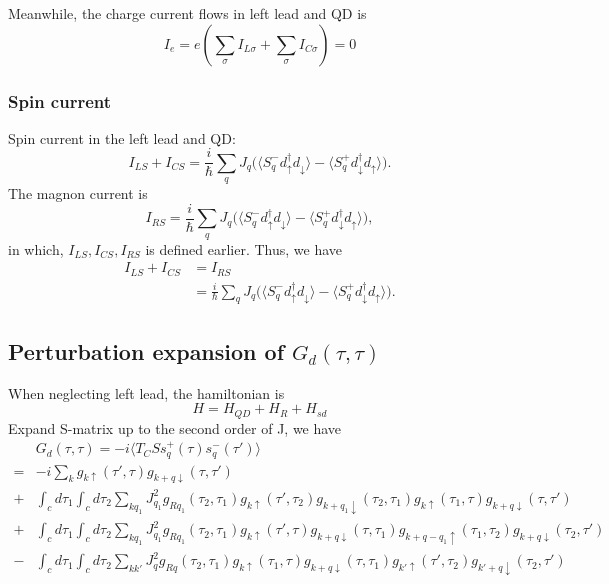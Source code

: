 \documentclass[11pt,a4paper]{book}
\begin{document}
Meanwhile, the charge current flows in left lead and QD is
\begin{equation}
I_{e} = e(\sum_{\sigma}I_{L\sigma} + \sum_{\sigma}I_{C\sigma}) = 0
\end{equation}
\subsubsection{Spin current}
Spin current in the left lead and QD:
\begin{equation}
I_{LS} + I_{CS} = \frac{i}{\hbar} \sum_{q} J_{q} \big( \big\langle S_{q}^{-}d_{\uparrow}^{\dag}d_{\downarrow}\big\rangle - \big\langle S_{q}^{+}d_{\downarrow}^{\dag}d_{\uparrow} \big\rangle \big) .
\end{equation}
The magnon current is
\begin{equation}
I_{RS} = \frac{i}{\hbar} \sum_{q} J_{q} \big( \big\langle S_{q}^{-}d_{\uparrow}^{\dag}d_{\downarrow}\big\rangle - \big\langle S_{q}^{+}d_{\downarrow}^{\dag}d_{\uparrow} \big\rangle \big) ,
\end{equation}
in which, $I_{LS}, I_{CS}, I_{RS}$ is defined earlier. Thus, we have
\begin{equation}
\begin{split}
I_{LS} + I_{CS} &= I_{RS}\\
& = \frac{i}{\hbar} \sum_{q} J_{q} \big( \big\langle S_{q}^{-}d_{\uparrow}^{\dag}d_{\downarrow}\big\rangle - \big\langle S_{q}^{+}d_{\downarrow}^{\dag}d_{\uparrow} \big\rangle \big) .
\end{split}
\end{equation}
\subsection{Perturbation expansion of $G_{d}(\tau, \tau)$}
When neglecting left lead, the hamiltonian is
\begin{equation}
H = H_{QD} + H_{R} + H_{sd}
\end{equation}
Expand S-matrix up to the second order of J, we have
\begin{equation}
\begin{split}
&G_{d}(\tau, \tau) = -i\langle T_{C}Ss_{q}^{+}(\tau)s_{q}^{-}(\tau') \rangle \\
=& -i\sum_{k} g_{k\uparrow}(\tau', \tau) g_{k+q\downarrow}(\tau, \tau') \\
+& \int_{c}d\tau_{1}\int_{c}d\tau_{2} \sum_{kq_{1}} J_{q_{1}}^{2} g_{Rq_{1}}(\tau_{2}, \tau_{1}) g_{k\uparrow}(\tau', \tau_{2}) g_{k+q_{1}\downarrow}(\tau_{2}, \tau_{1}) g_{k\uparrow}(\tau_{1}, \tau) g_{k+q\downarrow}(\tau, \tau') \\
+& \int_{c}d\tau_{1}\int_{c}d\tau_{2} \sum_{kq_{1}} J_{q_{1}}^{2} g_{Rq_{1}}(\tau_{2}, \tau_{1}) g_{k\uparrow}(\tau', \tau) g_{k+q\downarrow}(\tau, \tau_{1}) g_{k+q-q_{1}\uparrow}(\tau_{1}, \tau_{2}) g_{k+q\downarrow}(\tau_{2}, \tau') \\
-& \int_{c}d\tau_{1}\int_{c}d\tau_{2} \sum_{kk'} J_{q}^{2} g_{Rq}(\tau_{2}, \tau_{1}) g_{k\uparrow}(\tau_{1}, \tau) g_{k+q\downarrow}(\tau, \tau_{1})  g_{k'\uparrow}(\tau', \tau_{2}) g_{k'+q\downarrow}(\tau_{2}, \tau')
\end{split}
\end{equation}
\end{document}

